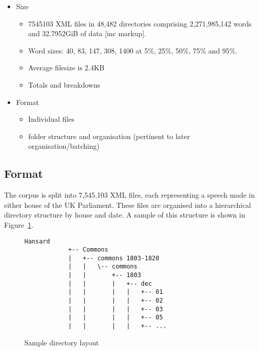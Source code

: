 
\begin{itemize}
    \item Size
        \begin{itemize}
            \item 7545103 XML files in 48,482 directories comprising 2,271,985,142 words and 32.7952GiB of data [inc markup].
            \item Word sizes: 40, 83, 147, 308, 1400 at 5\%, 25\%, 50\%, 75\% and 95\%.
            \item Average filesize is 2.4KB
            \item Totals and breakdowns
        \end{itemize}
    \item Format
        \begin{itemize}
            \item Individual files
            \item folder structure and organisation (pertinent to later organisation/batching)
        \end{itemize}
\end{itemize}

\subsection{Format}
The corpus is split into 7,545,103 XML files, each representing a speech made in either house of the UK Parliament.  These files are organised into a hierarchical directory structure by house and date.  A sample of this structure is shown in Figure~\ref{fig:structure}.

\begin{figure}[h]
    \centering
    {
        \small
        \begin{Verbatim}[frame=single]
            Hansard
            +-- Commons
            |   +-- commons 1803-1820
            |   |   \-- commons
            |   |       +-- 1803
            |   |       |   +-- dec
            |   |       |   |   +-- 01
            |   |       |   |   +-- 02
            |   |       |   |   +-- 03
            |   |       |   |   +-- 05
            |   |       |   |   +-- ...
        \end{Verbatim} 
    }
    \caption{Sample directory layout}
    \label{fig:structure}
\end{figure}


